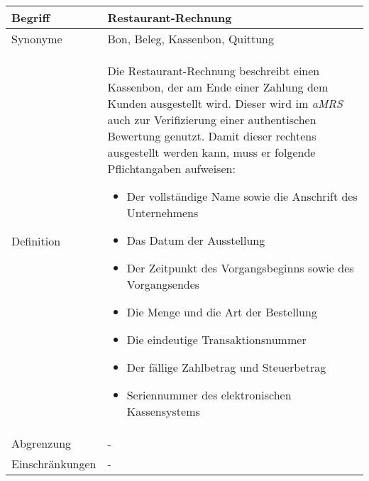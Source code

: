 \begin{table}[H]
    \centering
    \label{gls:restaurantRechnung}
    \begin{tabularx}{\textwidth}{| l | X |}
        \hline
        Begriff         & Restaurant-Rechnung                                                                                                                                                                                                                                                                             \\
        \hline
        Synonyme        & Bon, Beleg, Kassenbon, Quittung                                                                                                                                                                                                                                                                 \\
        \hline
        Definition      & Die Restaurant-Rechnung beschreibt einen Kassenbon, der am Ende einer Zahlung dem Kunden ausgestellt wird. Dieser wird im \textit{aMRS} auch zur Verifizierung einer authentischen Bewertung genutzt. Damit dieser rechtens ausgestellt werden kann, muss er folgende Pflichtangaben aufweisen:
        \begin{itemize}
            \item Der vollständige Name sowie die Anschrift des Unternehmens
            \item Das Datum der Ausstellung
            \item Der Zeitpunkt des Vorgangsbeginns sowie des Vorgangsendes
            \item Die Menge und die Art der Bestellung
            \item Die eindeutige Transaktionsnummer
            \item Der fällige Zahlbetrag und Steuerbetrag
            \item Seriennummer des elektronischen Kassensystems \autocite{bernhard_kostler_kassenbon-pflicht_2022}
        \end{itemize}
        \\
        \hline
        Abgrenzung      & -                                                                                                                                                                                                                                                                                               \\
        \hline
        Einschränkungen & -                                                                                                                                                                                                                                                                                               \\

\end{tabularx}
\end{table}
